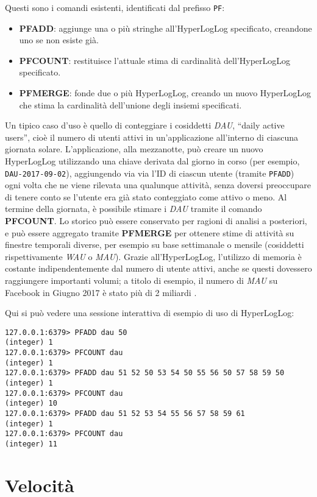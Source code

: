 Questi sono i comandi esistenti, identificati dal prefisso \verb|PF|:

\begin{itemize}
	\item \textbf{PFADD}: aggiunge una o più stringhe all'HyperLogLog specificato, creandone uno
	se non esiste già.
	\item \textbf{PFCOUNT}: restituisce l'attuale stima di cardinalità dell'HyperLogLog
	specificato.
	\item \textbf{PFMERGE}: fonde due o più HyperLogLog, creando un nuovo HyperLogLog che stima la
	cardinalità dell'unione degli insiemi specificati.
\end{itemize}

Un tipico caso d'uso è quello di conteggiare i cosiddetti \emph{DAU}, ``daily active users'', cioè
il numero di utenti attivi in un'applicazione all'interno di ciascuna giornata solare.
L'applicazione, alla mezzanotte, può creare un nuovo HyperLogLog utilizzando una chiave derivata dal
giorno in corso (per esempio, \verb|DAU-2017-09-02|), aggiungendo via via l'ID di ciascun utente
(tramite \verb|PFADD|) ogni volta che ne viene rilevata una qualunque attività, senza doversi
preoccupare di tenere conto se l'utente era già stato conteggiato come attivo o meno. Al termine
della giornata, è possibile stimare i \emph{DAU} tramite il comando \textbf{PFCOUNT}. Lo storico può
essere conservato per ragioni di analisi a posteriori, e può essere aggregato tramite
\textbf{PFMERGE} per ottenere stime di attività su finestre temporali diverse, per esempio su base
settimanale o mensile (cosiddetti rispettivamente \emph{WAU} o \emph{MAU}). Grazie all'HyperLogLog,
l'utilizzo di memoria è costante indipendentemente dal numero di utente attivi, anche se questi
dovessero raggiungere importanti volumi; a titolo di esempio, il numero di \emph{MAU} su Facebook in
Giugno 2017 è stato più di 2 miliardi \cite{fb-mau}.

Qui si può vedere una sessione interattiva di esempio di uso di HyperLogLog:

\medskip
\begin{lstlisting}
127.0.0.1:6379> PFADD dau 50
(integer) 1
127.0.0.1:6379> PFCOUNT dau
(integer) 1
127.0.0.1:6379> PFADD dau 51 52 50 53 54 50 55 56 50 57 58 59 50
(integer) 1
127.0.0.1:6379> PFCOUNT dau
(integer) 10
127.0.0.1:6379> PFADD dau 51 52 53 54 55 56 57 58 59 61
(integer) 1
127.0.0.1:6379> PFCOUNT dau
(integer) 11
\end{lstlisting}


\section{Velocit\`a}

